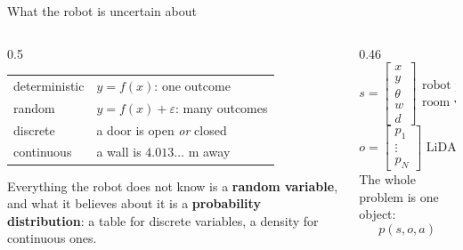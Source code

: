 \documentclass[10pt, aspectratio=169]{beamer}
\begin{document}
\begin{frame}{What the robot is uncertain about}
  \begin{columns}[c]
    \begin{column}{0.5\textwidth}
      \begin{tabular}{@{}l l@{}}
        \toprule
        deterministic & $y = f(x)$: one outcome \\
        random        & $y = f(x) + \varepsilon$: many outcomes \\
        \midrule
        discrete      & a door is open \emph{or} closed \\
        continuous    & a wall is $4.013\ldots$ m away \\
        \bottomrule
      \end{tabular}

      \vspace{1em}
      Everything the robot does not know is a \textbf{random variable}, and what it believes about
      it is a \textbf{probability distribution}: a table for discrete variables, a density for
      continuous ones.
    \end{column}
    \begin{column}{0.46\textwidth}
      \small
      \[
        s = \begin{bmatrix} x\\ y\\ \theta\\ w\\ d \end{bmatrix}\!
        \begin{array}{l}\text{robot pose}\\[0.2em] \text{room width, depth}\end{array}
      \]
      \[
        o = \begin{bmatrix} p_1\\ \vdots\\ p_N \end{bmatrix}\! \text{ LiDAR returns}
        \quad
        a = \begin{bmatrix} v_{\text{adv}}\\ v_{\text{side}}\\ \omega \end{bmatrix}\! \text{ command}
      \]
      The whole problem is one object:
      \[ p(s, o, a) \]
    \end{column}
  \end{columns}
\end{frame}
\end{document}
